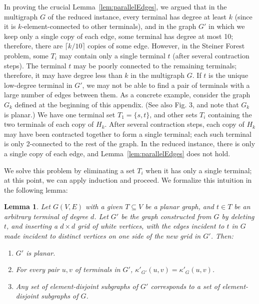 \documentclass[11pt]{article}
\newtheorem{lemma}{Lemma}[section]
\newcommand{\elconn}{\kappa'}
\def\ceil#1{\lceil {#1} \rceil}
\begin{document}
In proving the crucial Lemma~\ref{lem:parallelEdges}, we argued that
in the multigraph $G$ of the reduced instance, every terminal has
degree at least $k$ (since it is $k$-element-connected to other
terminals), and in the graph $G'$ in which we keep only a single copy
of each edge, some terminal has degree at most 10; therefore, there
are $\ceil{k/10}$ copies of some edge. However, in the Steiner Forest
problem, some $T_i$ may contain only a single terminal $t$ (after
several contraction steps). The terminal $t$ may be poorly connected
to the remaining terminals; therefore, it may have degree less than
$k$ in the multigraph $G$. If $t$ is the unique low-degree terminal in
$G'$, we may not be able to find a pair of terminals with a large
number of edges between them. As a concrete example, consider the
graph $G_k$ defined at the beginning of this appendix. (See also
Fig. 3, and note that $G_k$ is planar.) We have one terminal set $T_1
= \{s, t\}$, and other sets $T_i$ containing the two terminals of each
copy of $H_k$. After several contraction steps, each copy of $H_k$ may
have been contracted together to form a single terminal; each such
terminal is only 2-connected to the rest of the graph. In the reduced
instance, there is only a single copy of each edge, and
Lemma~\ref{lem:parallelEdges} does not hold. 

We solve this problem by eliminating a set $T_i$ when it has only a
single terminal; at this point, we can apply induction and proceed. We
formalize this intuition in the following lemma:

\begin{lemma}
  Let $G(V, E)$ with a given $T \subseteq V$ be a planar graph, and $t
  \in T$ be an arbitrary terminal of degree $d$. Let $G'$ be the graph
  constructed from $G$ by deleting $t$, and inserting a $d \times d$
  grid of white vertices, with the edges incident to $t$ in $G$ made
  incident to distinct vertices on one side of the new grid in
  $G'$. Then:
  \begin{enumerate}
    \item $G'$ is planar.
    \item For every pair $u, v$ of terminals in $G'$,
      $\elconn_{G'}(u, v) = \elconn_{G}(u, v)$.
    \item Any set of element-disjoint subgraphs of $G'$ corresponds to a
      set of element-disjoint subgraphs of $G$.
  \end{enumerate}
\end{lemma}
\end{document}
